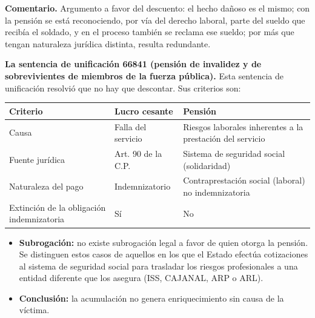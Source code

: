\begin{comentario}
\textcolor[HTML]{8A6D3B}{\textbf{Comentario. }}Argumento a favor del descuento: el hecho dañoso es el mismo; con la pensión se está reconociendo, por vía del derecho laboral, parte del sueldo que recibía el soldado, y en el proceso también se reclama ese sueldo; por más que tengan naturaleza jurídica distinta, resulta redundante.
\end{comentario}
\textbf{La sentencia de unificación 66841 (pensión de invalidez y de sobrevivientes de miembros de la fuerza pública).} Esta sentencia de unificación resolvió que no hay que descontar. Sus criterios son:

\begin{tabla}
\begin{longtable}{|>{\raggedright\arraybackslash}m{}|>{\raggedright\arraybackslash}m{}|>{\raggedright\arraybackslash}m{}|}
\hline
\cellcolor[HTML]{1F3864}\textcolor[HTML]{FFFFFF}{\textbf{Criterio}} & \cellcolor[HTML]{1F3864}\textcolor[HTML]{FFFFFF}{\textbf{Lucro cesante}} & \cellcolor[HTML]{1F3864}\textcolor[HTML]{FFFFFF}{\textbf{Pensión}} \\ \hline
Causa & Falla del servicio & Riesgos laborales inherentes a la prestación del servicio \\ \hline
\cellcolor[HTML]{F2F5FA}Fuente jurídica & \cellcolor[HTML]{F2F5FA}Art. 90 de la C.P. & \cellcolor[HTML]{F2F5FA}Sistema de seguridad social (solidaridad) \\ \hline
Naturaleza del pago & Indemnizatorio & Contraprestación social (laboral) no indemnizatoria \\ \hline
\cellcolor[HTML]{F2F5FA}Extinción de la obligación indemnizatoria & \cellcolor[HTML]{F2F5FA}Sí & \cellcolor[HTML]{F2F5FA}No \\ \hline
\end{longtable}
\end{tabla}
\begin{itemize}
\item \textbf{Subrogación:} no existe subrogación legal a favor de quien otorga la pensión. Se distinguen estos casos de aquellos en los que el Estado efectúa cotizaciones al sistema de seguridad social para trasladar los riesgos profesionales a una entidad diferente que los asegura (ISS, CAJANAL, ARP o ARL).
\item \textbf{Conclusión:} la acumulación no genera enriquecimiento sin causa de la víctima.
\end{itemize}
